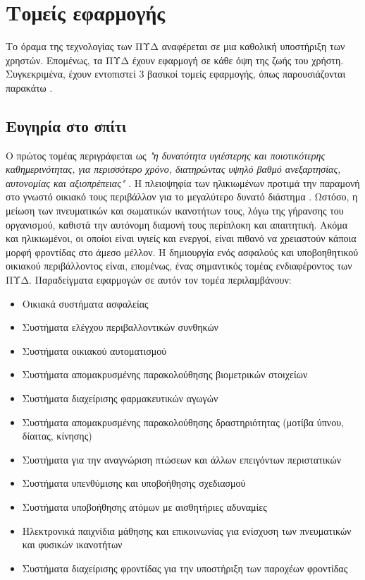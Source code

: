 \section{Τομείς εφαρμογής}
Το όραμα της τεχνολογίας των ΠΥΔ αναφέρεται σε μια καθολική υποστήριξη των χρηστών. Επομένως, τα ΠΥΔ έχουν εφαρμογή σε κάθε όψη της ζωής του χρήστη.
Συγκεκριμένα, έχουν εντοπιστεί 3 βασικοί τομείς εφαρμογής, όπως παρουσιάζονται παρακάτω \cite{broek}.

\subsection{Ευγηρία στο σπίτι}
Ο πρώτος τομέας περιγράφεται ως \textit{"η δυνατότητα υγιέστερης και ποιοτικότερης καθημερινότητας, για περισσότερο χρόνο, διατηρώντας υψηλό βαθμό ανεξαρτησίας, αυτονομίας και αξιοπρέπειας"} \cite{broek}.
Η πλειοψηφία των ηλικιωμένων προτιμά την παραμονή στο γνωστό οικιακό τους περιβάλλον για το μεγαλύτερο δυνατό διάστημα \cite{Mosca2016}.
Ωστόσο, η μείωση των πνευματικών και σωματικών ικανοτήτων τους, λόγω της γήρανσης του οργανισμού, καθιστά την αυτόνομη διαμονή τους περίπλοκη και απαιτητική.
Ακόμα και ηλικιωμένοι, οι οποίοι είναι υγιείς και ενεργοί, είναι πιθανό να χρειαστούν κάποια μορφή φροντίδας στο άμεσο μέλλον.
Η δημιουργία ενός ασφαλούς και υποβοηθητικού οικιακού περιβάλλοντος είναι, επομένως, ένας σημαντικός τομέας ενδιαφέροντος των ΠΥΔ.
Παραδείγματα εφαρμογών σε αυτόν τον τομέα περιλαμβάνουν:
\begin{itemize}
    \item Οικιακά συστήματα ασφαλείας
    \item Συστήματα ελέγχου περιβαλλοντικών συνθηκών
    \item Συστήματα οικιακού αυτοματισμού
    \item Συστήματα απομακρυσμένης παρακολούθησης βιομετρικών στοιχείων
    \item Συστήματα διαχείρισης φαρμακευτικών αγωγών
    \item Συστήματα απομακρυσμένης παρακολούθησης δραστηριότητας (μοτίβα ύπνου, δίαιτας, κίνησης)
    \item Συστήματα για την αναγνώριση πτώσεων και άλλων επειγόντων περιστατικών
    \item Συστήματα υπενθύμισης και υποβοήθησης σχεδιασμού
    \item Συστήματα υποβοήθησης ατόμων με αισθητήριες αδυναμίες
    \item Ηλεκτρονικά παιχνίδια μάθησης και επικοινωνίας για ενίσχυση των πνευματικών και φυσικών ικανοτήτων
    \item Συστήματα διαχείρισης φροντίδας για την υποστήριξη των παροχέων φροντίδας
\end{itemize}{}

